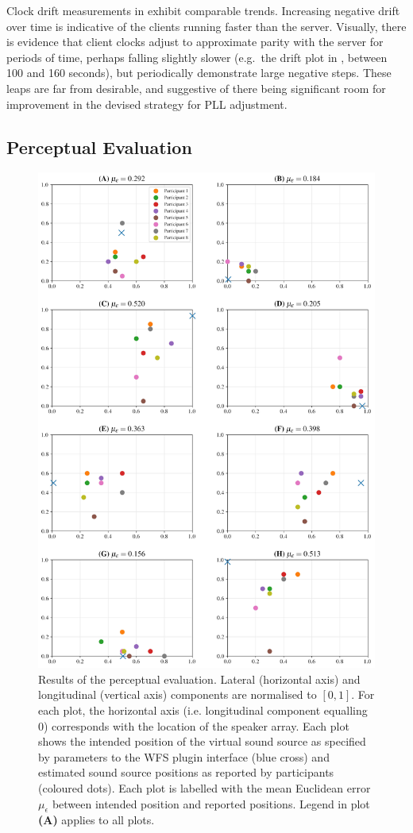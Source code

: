 Clock drift measurements in  exhibit
comparable trends.
Increasing negative drift over time is indicative of the clients running faster
than the server.
Visually, there is evidence that client clocks adjust to approximate parity
with the server for periods of time, perhaps falling slightly slower (e.g.\
the drift plot in , between 100 and 160 seconds), but
periodically demonstrate large negative steps.
These leaps are far from desirable, and suggestive of there being significant
room for improvement in the devised strategy for PLL adjustment.


\subsection{Perceptual Evaluation}\label{subsec:perceptual-evaluation}

\begin{figure}[h]
    \centering
    \includegraphics[width=.8\textwidth]{figures/subjective}
    \caption{
        Results of the perceptual evaluation.
        Lateral (horizontal axis) and longitudinal (vertical axis) components
        are normalised to $[0, 1]$.
        For each plot, the horizontal axis (i.e. longitudinal component
        equalling 0) corresponds with the location of the speaker array.
        Each plot shows the intended position of the virtual sound source as
        specified by parameters to the WFS plugin interface (blue cross) and
        estimated sound source positions as reported by participants (coloured
        dots).
        Each plot is labelled with the mean Euclidean error $\mu_\epsilon$
        between intended position and reported positions.
        Legend in plot \textbf{(A)} applies to all plots.
    }
    \label{fig:perceptual}
\end{figure}


